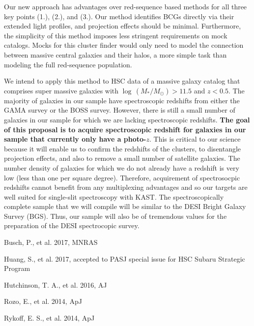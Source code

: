 \documentclass[letterpaper,12pt]{article}
\newenvironment{my_itemize}{
\begin{itemize}
  \setlength{\itemsep}{1pt}
  \setlength{\parskip}{0pt}
  \setlength{\parsep}{0pt}}{\end{itemize}
}
\begin{document}
Our new approach has advantages over red-sequence based methods for all three key points (1.), (2.), and (3.). Our
method identifies BCGs directly via their extended light profiles, and projection effects should be minimal.
Furthermore, the simplicity of this method imposes less stringent requirements on mock catalogs. Mocks for this cluster
finder would only need to model the connection between massive central galaxies and their halos, a more simple task
than modeling the full red-sequence population.

We intend to apply this method to HSC data of a massive galaxy catalog that comprises super massive galaxies with
$\log\,(M_*/M_\odot)>11.5$ and $z<0.5$. The majority of galaxies in our sample have spectroscopic redshifts from either
the GAMA survey or the BOSS survey. However, there is still a small number of galaxies in our sample for which we are
lacking spectroscopic redshifts. \textbf{The goal of this proposal is to acquire spectroscopic redshift for galaxies in
our sample that currently only have a photo-$z$}. This is critical to our science because it will enable
us to confirm the redshifts of the clusters, to disentangle projection effects, and also to remove a small number of
satellite galaxies. The number density of galaxies for which we do not already have a redshift is very low (less than
one per square degree). Therefore, acquirement of spectrosocpic redshifts cannot benefit from any multiplexing
advantages and so our targets are well suited for single-slit spectroscopy with KAST. The spectroscopically complete
sample that we will compile will be similar to the DESI Bright Galaxy Survey (BGS). Thus, our sample will also be of
tremendous values for the preparation of the DESI spectrocopic survey.

\clearpage

\begin{my_itemize}
\item Busch, P., et al. 2017, MNRAS
\item Huang, S., et al. 2017, accepted to PASJ special issue for HSC Subaru Strategic Program
\item Hutchinson, T. A., et al. 2016, AJ
\item Rozo, E., et al. 2014, ApJ
\item Rykoff, E. S., et al. 2014, ApJ
\end{my_itemize}
\end{document}
